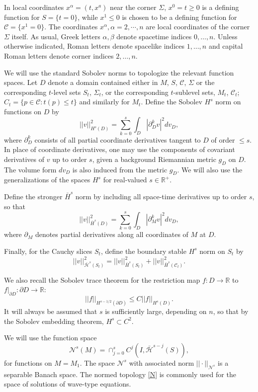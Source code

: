 \documentclass[10pt]{amsart}
\renewcommand{\a}{\alpha}
\renewcommand{\b}{\beta}
\newcommand{\Si}{\Sigma}
\newcommand{\cC}{{\mathcal C}}
\newcommand{\cN}{{\mathcal N}}
\newcommand{\cH}{{\mathcal H}}
\newcommand{\bR}{\mathbb R}
\newcommand{\be}{\begin{equation}}
\newcommand{\ee}{\end{equation}}
\newcommand{\p}{\partial}
\renewcommand{\to}{\rightarrow}
\newcommand{\<}{\langle}
\renewcommand{\>}{\rangle}
\theoremstyle{plain}
\theoremstyle{remark}
\theoremstyle{definition}
\numberwithin{equation}{section}
\begin{document}
   In local coordinates $x^{\a} = (t, x^a)$ near the corner $\Si$, $x^0 = t \geq 0$ is a defining function for $S = \{t = 0\}$, while $x^1 \leq 0$ is chosen 
to be a defining function for $\cC = \{x^1 = 0\}$. The coordinates $x^{\a}, \a = 2, \cdots, n$ are local coordinates of the corner $\Si$ itself. 
As usual, Greek letters $\a, \b$ denote spacetime indices $0, \dots, n$. Unless otherwise indicated, Roman letters denote spacelike indices $1, \dots, n$ 
and capital Roman letters denote corner indices $2, \dots, n$. 

\medskip 
 
  We will use the standard Sobolev norms to topologize the relevant function spaces. Let $D$ denote a domain contained either in  
$M$, $S$, $\cC$, $\Si$ or the corresponding $t$-level sets $S_t$, $\Si_t$, or the corresponding $t$-sublevel sets, $M_t$, $\cC_t$; $C_t = 
\{p \in \cC: t(p) \leq t\}$ and similarly for $M_t$.  Define the Sobolev $H^s$ norm on 
functions on $D$ by 
 $$||v||_{H^s(D)}^2 = \sum_{k=0}^s\int_{D} |\p_D^k v|^2dv_D,$$
where $\p_D^k$ consists of all partial coordinate derivatives tangent to $D$ of order $\leq s$. In place of coordinate derivatives, one may use the 
components of covariant derivatives of $v$ up to order $s$, given a background Riemannian metric $g_D$ on $D$. The volume form $dv_D$ is also 
induced from the metric $g_{D}$. We will also use the generalizations of the spaces $H^s$ for real-valued $s \in \bR^+$. 

  Define the stronger $\bar H^s$ norm by including all space-time derivatives up to order $s$, so that 
$$||v||_{\bar H^s(D)}^2 = \sum_{k=0}^s \int_{D} |\p_M^k v|^2dv_D,$$
where $\p_M$ denotes partial derivatives along all coordinates of $M$ at $D$. 
 
  Finally, for the Cauchy slices $S_t$, define the boundary stable $H^s$ norm on $S_t$ by 
$$||v||_{\bar \cH^s(S_t)}^2 = ||v||_{\bar H^s(S_t)}^2 + ||v||_{\bar H^s(\cC_t)}^2.$$
  
  We also recall the Sobolev trace theorem for the restriction map $f:D \to \bR$ to $f|_{\p D}: \p D \to \bR$:
$$||f||_{H^{s-1/2}(\p D)} \leq C||f||_{H^s(D)}.$$
It will always be assumed that $s$ is sufficiently large, depending on $n$, so that by the Sobolev embedding theorem, $H^s \subset C^2$.   

  We will use the function space  
\be \label{N}
\cN^s(M) = \cap_{j=0}^s C^j(I, \bar \cH^{s-j}(S)),
\ee
for functions on $M = M_1$. The space $\cN^s$ with associated norm $|| \cdot ||_{\cN^s}$ is a separable Banach space. The normed 
topology \eqref{N} is commonly used for the space of solutions of wave-type equations. 
\end{document}
